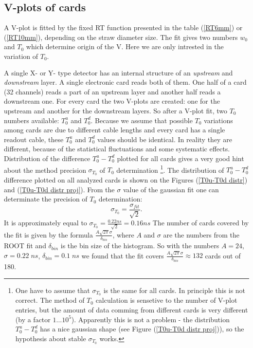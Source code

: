 \documentclass[a4paper,12pt]{article}
\begin{document}
\subsection{V-plots of cards}
A V-plot is fitted by the fixed RT function presented in the table (\ref{RT6mm}) or (\ref{RT10mm}),
depending on the straw diameter size.
The fit gives two numbers $w_0$ and $T_0$ which
determine origin of the V. Here we are only intrested in the
variation of $T_0$.


A single X- or Y- type detector has an internal structure of an
{\it upstream} and {\it downstream} layer. A single electronic card
reads both of them. One half
of a card (32 channels) reads a part of an upstream layer and another half reads
a downstream one. For every card the two V-plots are created: one for the
upstream and another for the  downstream layers. So after a V-plot fit,
two $T_0$ numbers available:
$T_0^u$ and $T_0^d$. Because we assume that possible $T_0$ variations
among cards are due to different cable lengths and every card has a single readout cable,
these $T_0^u$ and $T_0^d$ values should be identical.
In reality they are different, because of the statistical fluctuations and
some systematic effects. Distribution of the difference $T_0^u - T_0^d$
plotted for all cards gives a very good hint about the method precision
$\sigma_{T_0}$ of $T_0$ determination
\footnote{One have to assume that $\sigma_{T_0}$ is the same for all cards.
In principle this is not correct. The method of $T_0$ calculation is sensetive to
the number of V-plot entries, but the amount of data comming from different cards
is very different (by a factor $1\dots10^5$). Apparently this is
not a problem - the distribution $T_0^u - T_0^d$ has a nice gaussian shape
(see Figure (\ref{T0u-T0d distr proj})),
so the hypothesis about stable $\sigma_{T_0}$ works.}.
The distribution of $T_0^u - T_0^d$ difference plotted
on all analyzed cards is shown on the Figures (\ref{T0u-T0d distr}) and (\ref{T0u-T0d distr proj}).
From the $\sigma$ value
of the gaussian fit one can determinate the precision of $T_0$
determination:
$$\sigma_{T_0} = \frac{\sigma_{fit}}{\sqrt{2}}.$$
It is approximately equal to $\sigma_{T_0} = \frac{0.22 ns}{\sqrt{2}} = 0.16 ns$
The number of cards covered by the fit is given by the formula
$\frac{A \sqrt{2\pi} \sigma}{\delta_{bin}}$,
where $A$ and $\sigma$ are the numbers from the ROOT fit and $\delta_{bin}$ is the bin size
of the histogram. So with the numbers $A=24$, $\sigma=0.22\;ns$, $\delta_{bin}=0.1\;ns$
we found that the fit covers $\frac{A \sqrt{2\pi} \sigma}{\delta_{bin}} \approx 132$ cards
out of 180.
\end{document}
